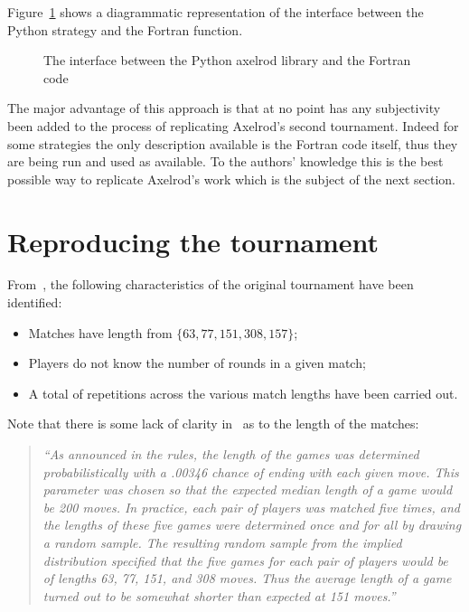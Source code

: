 \documentclass{article}
\begin{document}
Figure~\ref{fig:strategy_diagram} shows a diagrammatic representation of the
interface between the Python strategy and the Fortran function.

\begin{figure}[!hbtp]
    \begin{center}
        \scalebox{.8}{
            
                     }
        \caption{The interface between the Python axelrod library and the
        Fortran code}
        \label{fig:strategy_diagram}
    \end{center}
\end{figure}

The major advantage of this approach is that at no point has any subjectivity
been added to the process of replicating Axelrod's second tournament. Indeed for
some strategies the only description available is the Fortran code itself, thus
they are being run and used as available. To the authors' knowledge this is the
best possible way to replicate Axelrod's work which is the subject of the next
section.

\section{Reproducing the tournament}\label{sec:reproducing}

From~\cite{Axelrod1980b}, the following characteristics of the original
tournament have been identified:

\begin{itemize}
    \item Matches have length from \(\{63, 77, 151, 308, 157\}\);
    \item Players do not know the number of rounds in a given match;
    \item A total of repetitions
        across the various match lengths have been carried out.
\end{itemize}

Note that there is some lack of clarity in~\cite{Axelrod1980b} as to the length
of the matches:

\begin{quote}
    \textit{``As announced in the rules, the length of the games was determined
        probabilistically with a .00346 chance of ending with each given move.
        This parameter was chosen so that the expected median length of a game
        would be 200 moves. In practice, each pair of players was matched five
        times, and the lengths of these five games were determined once and for
        all by drawing a random sample. The resulting random sample from the
        implied distribution specified that the five games for each pair of
        players would be of lengths 63, 77, 151, and 308 moves. Thus the average
    length of a game turned out to be somewhat shorter than expected at 151
moves.''}
\end{quote}
\end{document}
